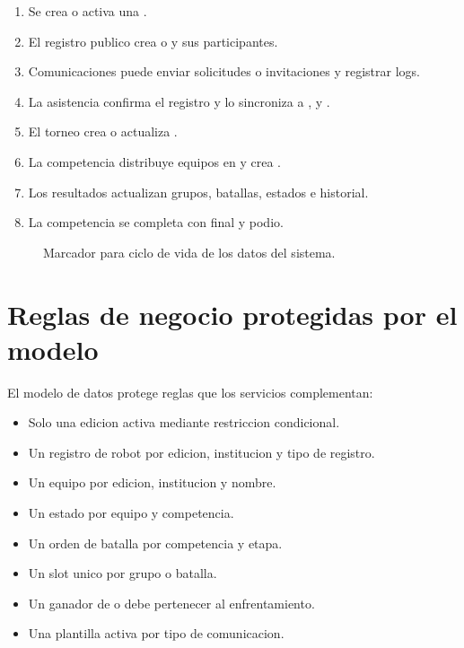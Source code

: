 \begin{enumerate}
  \item Se crea o activa una .
  \item El registro publico crea  o  y sus participantes.
  \item Comunicaciones puede enviar solicitudes o invitaciones y registrar logs.
  \item La asistencia confirma el registro y lo sincroniza a ,  y .
  \item El torneo crea o actualiza .
  \item La competencia distribuye equipos en  y crea .
  \item Los resultados actualizan grupos, batallas, estados e historial.
  \item La competencia se completa con final y podio.
\end{enumerate}

\begin{figure}[H]
  \centering
  \caption{Marcador para ciclo de vida de los datos del sistema.}
  \label{fig:modelo-ciclo-vida}
\end{figure}

\section{Reglas de negocio protegidas por el modelo}
\label{sec:modelo-reglas}

El modelo de datos protege reglas que los servicios complementan:

\begin{itemize}
  \item Solo una edicion activa mediante restriccion condicional.
  \item Un registro de robot por edicion, institucion y tipo de registro.
  \item Un equipo por edicion, institucion y nombre.
  \item Un estado por equipo y competencia.
  \item Un orden de batalla por competencia y etapa.
  \item Un slot unico por grupo o batalla.
  \item Un ganador de  o  debe pertenecer al enfrentamiento.
  \item Una plantilla activa por tipo de comunicacion.
\end{itemize}


